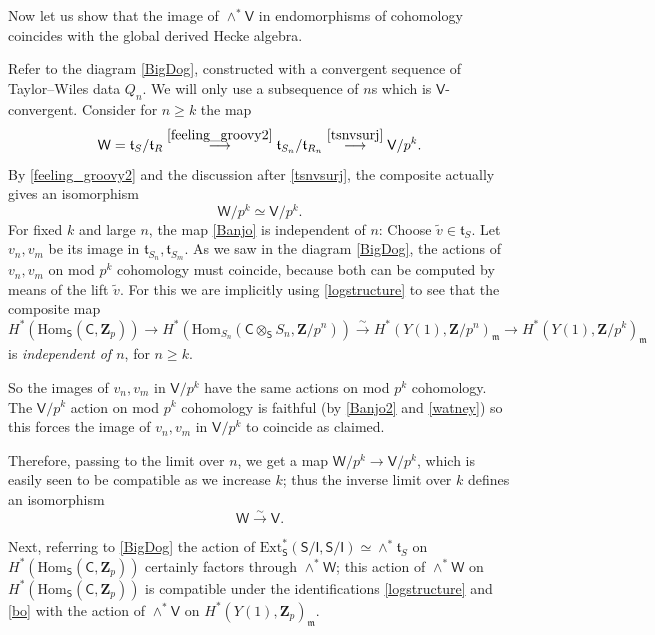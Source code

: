 \documentclass[10pt]{amsart}
\newcommand{\Z}{\mathbf{Z}}
\newcommand{\Ext}{\mathrm{Ext}}
\newcommand{\Winf}{\mathsf{W}}
\newcommand{\Hom}{\mathrm{Hom}}
\newcommand{\Vinf}{\mathsf{V}}
\newcommand{\Cinf}{\mathsf{C}}
\newcommand{\Sinf}{\mathsf{S}}
\newcommand{\Iinf}{\mathsf{I}}
\theoremstyle{remark}
\begin{document}
Now let us show that the image of $\wedge^* \Vinf$  in endomorphisms
of cohomology coincides with the global derived Hecke algebra.

 
Refer to the diagram \eqref{BigDog}, constructed with a   convergent sequence of Taylor--Wiles data $Q_n$. 
We will only use a subsequence of $n$s which is $\Vinf$-convergent. 
Consider for $n \geq k$ the map
\begin{equation} \label{Banjo} \Winf   = \mathfrak{t}_{S}/\mathfrak{t}_R  \stackrel{\eqref{feeling_groovy2}}{\longrightarrow} \mathfrak{t}_{S_n}/\mathfrak{t}_{R_n} 
\stackrel{\eqref{tsnvsurj}}{ \longrightarrow} \Vinf/p^k. \end{equation}
By \eqref{feeling_groovy2} and the discussion after \eqref{tsnvsurj}, 
the composite actually gives an isomorphism \begin{equation} \label{Banjo2} \Winf/p^k \simeq \Vinf/p^k.\end{equation}  
\label{DDR REF4} For fixed $k$ and large $n$, the map \eqref{Banjo} is independent of $n$: Choose $\tilde{v} \in \mathfrak{t}_S$. Let $v_n, v_m$
 be its image in $\mathfrak{t}_{S_n}, \mathfrak{t}_{S_m}$.
 As we saw in the diagram \eqref{BigDog}, the actions of $v_n, v_m$ on mod $p^k$ cohomology must coincide, 
 because both can be computed by means of the lift $\tilde{v}$. 
For this we are implicitly using  \eqref{logstructure} to see that  the composite map
{\small  \begin{equation}
 H^*(\Hom_{\Sinf}(\Cinf, \Z_p)) \rightarrow 
 H^*(\Hom_{S_n}(\Cinf \otimes_{\Sinf} S_n, \Z/p^n))   \stackrel{\sim}{ \rightarrow}
  H^*(Y(1), \Z/p^n)_{\mathfrak{m}}  
 \rightarrow   H^*(Y(1), \Z/p^k)_{\mathfrak{m}}
  \end{equation}}
is {\em independent of $n$}, for $n \geq k$.


%
%
%
%
%
 So the images of $v_n, v_m$ in $\Vinf/p^k$ have the same actions on mod $p^k$ cohomology. 
The $\Vinf/p^k$ action on mod $p^k$ cohomology is faithful (by \eqref{Banjo2} and \eqref{watney}) so this forces  the image of $v_n, v_m$
in $\Vinf/p^k$ to coincide as claimed.  
  
Therefore, passing to the limit over $n$, we get a map $\Winf/p^k \rightarrow \Vinf/p^k$, 
which is easily seen to be compatible as we increase $k$; thus the inverse limit over $k$
defines an isomorphism \begin{equation} \label{bo} \Winf  \stackrel{\sim}{\rightarrow} \Vinf.\end{equation}


Next, referring to \eqref{BigDog} the action of $\Ext_{\Sinf}^*(\Sinf/\Iinf, \Sinf/\Iinf) \simeq \wedge^* \mathfrak{t}_S$
on $H^*(\Hom_{\Sinf}(\Cinf,  \Z_p))$ certainly factors through $\wedge^*  \Winf $;
this action of $\wedge^* \Winf$ on $H^*(\Hom_{\Sinf}(\Cinf, \Z_p))$  is compatible
under the identifications  \eqref{logstructure} and  \eqref{bo} with the action of $\wedge^* \Vinf$ on  $H^*(Y(1), \Z_p)_{\mathfrak{m}}$. 
\end{document}
